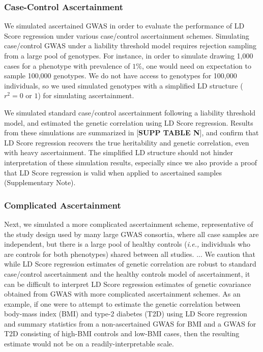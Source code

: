 \documentclass[11pt]{article}
\numberwithin{equation}{section}
\begin{document}
\subsubsection{Case-Control Ascertainment}
We simulated ascertained GWAS in order to evaluate the performance of 
LD Score regression under various case/control ascertainment schemes.
Simulating case/control GWAS under a liability threshold model requires rejection
sampling from a large pool of genotypes.
For instance, in order to simulate drawing 1,000 cases 
for a phenotype with prevalence of $1\%$, 
one would need on expectation to sample 100,000 genotypes.
We do not have access to genotypes for 100,000 individuals, 
so we used simulated genotypes with a simplified LD structure 
($r^2=0$ or $1$) for simulating ascertainment.

We simulated standard case/control ascertainment following a liability threshold model, 
and estimated the genetic correlation using LD Score regression. 
Results from these simulations are summarized in [\textbf{SUPP TABLE N}],
and confirm that LD Score regression recovers the true heritability and genetic correlation, even with heavy ascertainment.
The simplified LD structure should not hinder interpretation of these simulation results, especially
since we also provide a proof that LD Score regression is valid when applied to ascertained samples (Supplementary Note).


\subsubsection{Complicated Ascertainment}


Next, we simulated a more complicated ascertainment scheme,
representative of the study design used by many large GWAS consortia,
where all case samples are independent, 
but there is a large pool of healthy controls 
(\emph{i.e.,} individuals who are controls for both phenotypes)
shared between all studies.
...
We caution that while LD Score regression estimates of genetic correlation are robust to
standard case/control ascertainment and the healthy controls model of ascertainment, 
it can be difficult to interpret LD Score regression estimates of genetic covariance 
obtained from GWAS with more complicated ascertainment schemes.
As an example, 
if one were to attempt to estimate the genetic correlation between body-mass index (BMI) and type-2 diabetes (T2D)
using LD Score regression and summary statistics from a non-ascertained GWAS for BMI
and a GWAS for T2D consisting of high-BMI controls and low-BMI cases,
then the resulting estimate would not be on a readily-interpretable scale.
\end{document}
